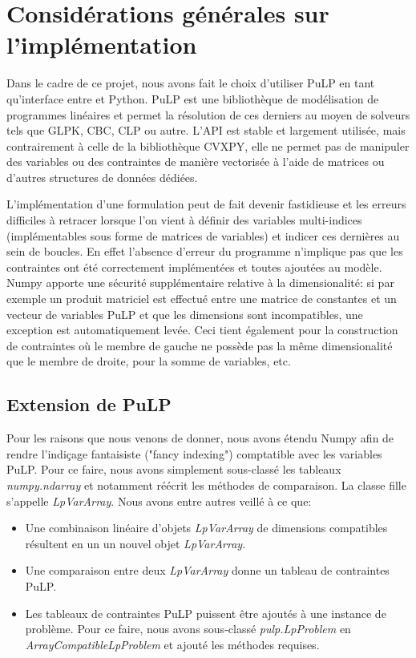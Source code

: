 \chapter{Considérations générales sur l'implémentation}
\vspace*{1.2cm}

Dans le cadre de ce projet, nous avons fait le choix d'utiliser PuLP en tant qu'interface entre
\solver et Python. PuLP est une bibliothèque de modélisation de programmes linéaires et permet
la résolution de ces derniers au moyen de solveurs tels que GLPK, CBC, CLP ou autre.
L'API est stable et largement utilisée, mais contrairement à celle de la bibliothèque CVXPY,
elle ne permet pas de manipuler des variables ou des contraintes de manière vectorisée à l'aide
de matrices ou d'autres structures de données dédiées.

L'implémentation d'une formulation peut de fait devenir fastidieuse et les erreurs difficiles à
retracer lorsque l'on vient à définir des variables multi-indices (implémentables sous forme
de matrices de variables) et indicer ces dernières au sein de boucles. En effet l'absence d'erreur du programme
n'implique pas que les contraintes ont été correctement implémentées et toutes ajoutées au modèle.
Numpy apporte une sécurité supplémentaire relative à la dimensionalité: si par exemple un produit matriciel est effectué
entre une matrice de constantes et un vecteur de variables PuLP et que les dimensions sont incompatibles,
une exception est automatiquement levée. Ceci tient également pour la construction de contraintes où le membre de gauche ne possède pas
la même dimensionalité que le membre de droite, pour la somme de variables, etc.

\section{Extension de PuLP}

Pour les raisons que nous venons de donner, nous avons étendu Numpy afin de rendre l'indiçage 
fantaisiste ("fancy indexing") comptatible avec les variables PuLP. Pour ce faire, nous avons
simplement sous-classé les tableaux \textit{numpy.ndarray} et notamment réécrit les méthodes de comparaison.
La classe fille s'appelle \textit{LpVarArray}. Nous avons entre autres veillé à ce que:
\begin{itemize}
  \item Une combinaison linéaire d'objets \textit{LpVarArray} de dimensions compatibles résultent en un
  un nouvel objet \textit{LpVarArray}.
  \item Une comparaison entre deux \textit{LpVarArray} donne un tableau de contraintes PuLP.
  \item Les tableaux de contraintes PuLP puissent être ajoutés à une instance de problème.
  Pour ce faire, nous avons sous-classé \textit{pulp.LpProblem} en \textit{ArrayCompatibleLpProblem}
  et ajouté les méthodes requises.
\end{itemize}

